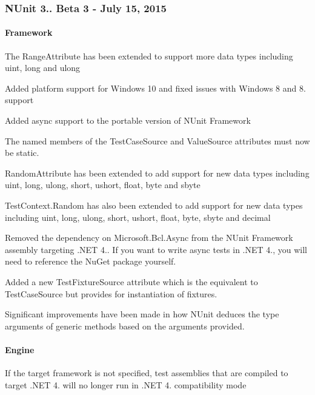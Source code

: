 \subsubsection*{N\+Unit 3.. Beta 3 -\/ July 15, 2015}

\paragraph*{Framework}


\begin{DoxyItemize}
\item The Range\+Attribute has been extended to support more data types including uint, long and ulong
\item Added platform support for Windows 10 and fixed issues with Windows 8 and 8. support
\item Added async support to the portable version of N\+Unit Framework
\item The named members of the Test\+Case\+Source and Value\+Source attributes must now be static.
\item Random\+Attribute has been extended to add support for new data types including uint, long, ulong, short, ushort, float, byte and sbyte
\item Test\+Context.\+Random has also been extended to add support for new data types including uint, long, ulong, short, ushort, float, byte, sbyte and decimal
\item Removed the dependency on Microsoft.\+Bcl.\+Async from the N\+Unit Framework assembly targeting .N\+ET 4.. If you want to write async tests in .N\+ET 4., you will need to reference the Nu\+Get package yourself.
\item Added a new Test\+Fixture\+Source attribute which is the equivalent to Test\+Case\+Source but provides for instantiation of fixtures.
\item Significant improvements have been made in how N\+Unit deduces the type arguments of generic methods based on the arguments provided.
\end{DoxyItemize}

\paragraph*{Engine}


\begin{DoxyItemize}
\item If the target framework is not specified, test assemblies that are compiled to target .N\+ET 4. will no longer run in .N\+ET 4. compatibility mode
\end{DoxyItemize}

